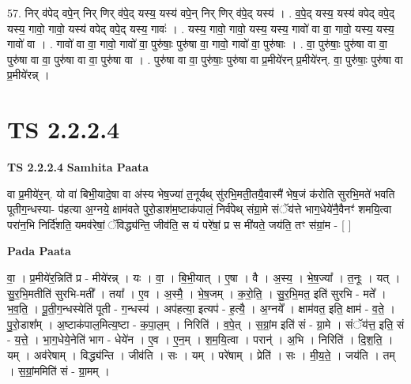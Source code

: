 \documentclass[17pt]{extarticle}
\begin{document}
57. निर् व॑पेद् वपे॒न् निर् णिर् व॑पे॒द् यस्य॒ यस्य॑ वपे॒न् निर् णिर् व॑पे॒द् यस्य॑ । . व॒पे॒द् यस्य॒ यस्य॑ वपेद् वपे॒द् यस्य॒ गावो॒ गावो॒ यस्य॑ वपेद् वपे॒द् यस्य॒ गावः॑ । . यस्य॒ गावो॒ गावो॒ यस्य॒ यस्य॒ गावो॑ वा वा॒ गावो॒ यस्य॒ यस्य॒ गावो॑ वा । . गावो॑ वा वा॒ गावो॒ गावो॑ वा॒ पुरु॑षाः॒ पुरु॑षा वा॒ गावो॒ गावो॑ वा॒ पुरु॑षाः । . वा॒ पुरु॑षाः॒ पुरु॑षा वा वा॒ पुरु॑षा वा वा॒ पुरु॑षा वा वा॒ पुरु॑षा वा । . पुरु॑षा वा वा॒ पुरु॑षाः॒ पुरु॑षा वा प्र॒मीये॑रन् प्र॒मीये॑रन्. वा॒ पुरु॑षाः॒ पुरु॑षा वा प्र॒मीये॑रन्न् । \newline
\pagebreak
{}

\section{ TS 2.2.2.4 }

\textbf{TS 2.2.2.4 } \newline
\textbf{Samhita Paata} \newline

वा प्र॒मीये॑र॒न्. यो वा॑ बिभी॒यादे॒षा वा अ॑स्य भेष॒ज्या॑ त॒नूर्यथ् सु॑रभि॒मती॒तयै॒वास्मै॑ भेष॒जं क॑रोति सुरभि॒मते॑ भवति पूतीग॒न्धस्या- प॑हत्या अ॒ग्नये॒ क्षाम॑वते पुरो॒डाश॑म॒ष्टाक॑पालं॒ निर्व॑पेथ् संग्रा॒मे संॅय॑त्ते भाग॒धेये॑नै॒वैनꣳ॑ शमयि॒त्वा परा॑न॒भि निर्दि॑शति॒ यमव॑रेषां॒ ॅविद्ध्य॑न्ति॒ जीव॑ति॒ स यं परे॑षां॒ प्र स मी॑यते॒ जय॑ति॒ तꣳ स॑ग्रां॒म - [  ] \newline

\textbf{Pada Paata} \newline

वा॒ । प्र॒मीये॑र॒न्निति॑ प्र - मीये॑रन्न् । यः । वा॒ । बि॒भी॒यात् । ए॒षा । वै । अ॒स्य॒ । भे॒ष॒ज्या᳚ । त॒नूः । यत् । सु॒र॒भि॒मतीति॑ सुरभि-मती᳚ । तया᳚ । ए॒व । अ॒स्मै॒ । भे॒ष॒जम् । क॒रो॒ति॒ । सु॒र॒भि॒मत॒ इति॑ सुरभि - मते᳚ । भ॒व॒ति॒ । पू॒ती॒ग॒न्धस्येति॑ पूती - ग॒न्धस्य॑ । अप॑हत्या॒ इत्यप॑ - ह॒त्यै॒ । अ॒ग्नये᳚ । क्षाम॑वत॒ इति॒ क्षाम॑ - व॒ते॒ । पु॒रो॒डाश᳚म् । अ॒ष्टाक॑पाल॒मित्य॒ष्टा - क॒पा॒ल॒म् । निरिति॑ । व॒पे॒त् । स॒ग्रां॒म इति॑ सं - ग्रा॒मे । संॅय॑त्त॒ इति॒ सं - य॒त्ते॒ । भा॒ग॒धेये॒नेति॑ भाग - धेये॑न । ए॒व । ए॒न॒म् । श॒म॒यि॒त्वा । परान्॑ । अ॒भि । निरिति॑ । दि॒श॒ति॒ । यम् । अव॑रेषाम् । विद्ध्य॑न्ति । जीव॑ति । सः । यम् । परे॑षाम् । प्रेति॑ । सः । मी॒य॒ते॒ । जय॑ति । तम् । स॒ग्रां॒ममिति॑ सं - ग्रा॒मम् ।  \newline
\end{document}

